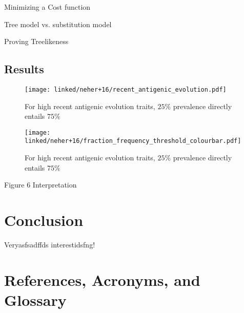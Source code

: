 \documentclass[12pt]{scrartcl}
\begin{document}
    Minimizing a Cost function

    Tree model vs. substitution model

    Proving Treelikeness

  \subsection{Results}

  \begin{figure}[h!]
    \texttt{[image: linked/neher+16/recent\_antigenic\_evolution.pdf]}
    \caption{\footnotesize For high recent antigenic evolution traits, $25\%$ prevalence directly entails $75\%$ \cite{neherBedford+16}}
  \end{figure}

  \begin{figure}[h!]
    \texttt{[image: linked/neher+16/fraction\_frequency\_threshold\_colourbar.pdf]}
    \caption{\footnotesize For high recent antigenic evolution traits, $25\%$ prevalence directly entails $75\%$ \cite{neherBedford+16}}
  \end{figure}

    Figure 6 Interpretation

\section{Conclusion}

  Veryasfsadffds interestidsfng!

\clearpage


\section{References, Acronyms, and Glossary}





\printglossary[type=\acronymtype]

\printglossary

% 

% 


\end{document}
